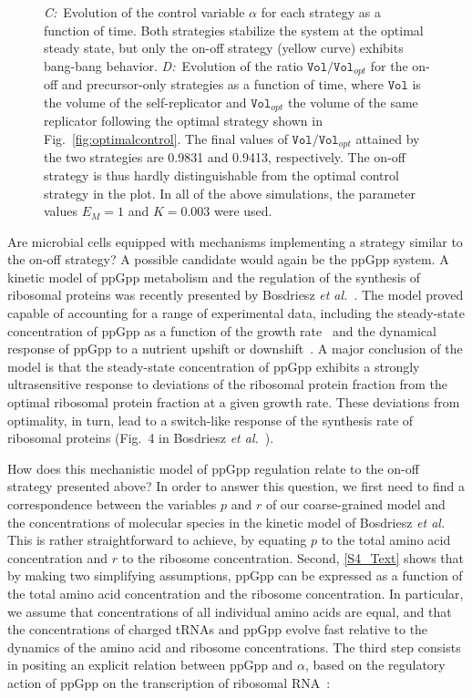 \begin{figure}[p]
{\textit{C:}~Evolution of the control variable $\alpha$ for each strategy as a function of time.
Both strategies stabilize the system at the optimal steady state, but only the on-off strategy (yellow curve) exhibits bang-bang behavior.
\textit{D:}~Evolution of the ratio $\texttt{Vol} / \texttt{Vol}_{opt}$ for the on-off and precursor-only strategies as a function of time, where $\texttt{Vol}$ is the volume of the self-replicator and $\texttt{Vol}_{opt}$ the volume of the same replicator following the optimal strategy shown in Fig.~\ref{fig:optimalcontrol}.
The final values of $\texttt{Vol} / \texttt{Vol}_{opt}$ attained by the two strategies are 0.9831 and 0.9413, respectively.
The on-off strategy is thus hardly distinguishable from the optimal control strategy in the plot.
In all of the above simulations, the parameter values $E_M=1$ and $K=0.003$ were used.
}
\label{fig:onoffresults}
\end{figure}

Are microbial cells equipped with mechanisms implementing a strategy similar to the on-off strategy?
A possible candidate would again be the ppGpp system.
A kinetic model of ppGpp metabolism and the regulation of the synthesis of ribosomal proteins was recently presented by Bosdriesz \textit{et al.}~\cite{bosdriesz_how_2015}.
The model proved capable of accounting for a range of experimental data, including the steady-state concentration of ppGpp as a function of the growth rate~\cite{bremer_modulation_1996} and the dynamical response of ppGpp to a nutrient upshift or downshift~\cite{murray_control_2003}.
A major conclusion of the model is that the steady-state concentration of ppGpp exhibits a strongly ultrasensitive response to deviations of the ribosomal protein fraction from the optimal ribosomal protein fraction at a given growth rate. 
These deviations from optimality, in turn, lead to a switch-like response of the synthesis rate of ribosomal proteins (Fig.~4 in Bosdriesz \textit{et al.}~\cite{bosdriesz_how_2015}).

How does this mechanistic model of ppGpp regulation relate to the on-off strategy presented above?
In order to answer this question, we first need to find a correspondence between the variables $p$ and $r$ of our coarse-grained model and the concentrations of molecular species in the kinetic model of Bosdriesz \textit{et al.}
This is rather straightforward to achieve, by equating $p$ to the total amino acid concentration and $r$ to the ribosome concentration.
Second, \ref{S4_Text} shows that by making two simplifying assumptions, ppGpp can be expressed as a function of the total amino acid concentration and the ribosome concentration.
In particular, we assume that concentrations of all individual amino acids are equal, and that the concentrations of charged tRNAs and ppGpp evolve fast relative to the dynamics of the amino acid and ribosome concentrations.
The third step consists in positing an explicit relation between ppGpp and $\alpha$, based on the regulatory action of ppGpp on the transcription of ribosomal RNA~\cite{dennis_control_2004}:

